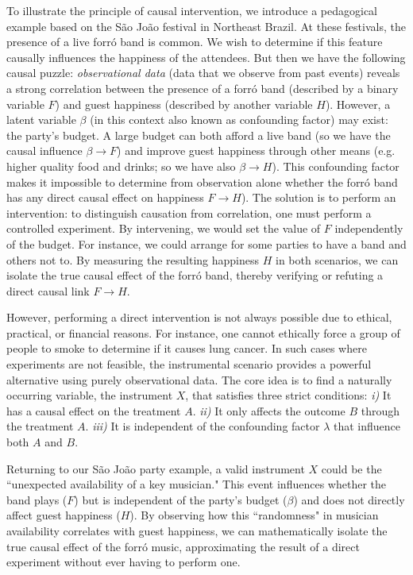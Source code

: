 \documentclass[aps,pra,reprint, superscriptaddress,showkeys]{revtex4-2}
\theoremstyle{plain}
\begin{document}
To illustrate the principle of causal intervention, we introduce a pedagogical example based on the São João festival in Northeast Brazil. At these festivals, the presence of a live forró band is common. We wish to determine if this feature causally influences the happiness of the attendees. But then we have the following causal puzzle: \textit{observational data} (data that we observe from past events) reveals a strong correlation between the presence of a forró band (described by a binary variable $F$) and guest happiness (described by another variable $H$). However, a latent variable $\beta$ (in this context also known as confounding factor) may exist: the party's budget. A large budget can both afford a live band (so we have the causal influence $\beta\longrightarrow F$) and improve guest happiness through other means (e.g. higher quality food and drinks; so we have also $\beta\longrightarrow H$). This confounding factor makes it impossible to determine from observation alone whether the forró band has any direct causal effect on happiness $F\longrightarrow H$). The solution is to perform an intervention: to distinguish causation from correlation, one must perform a controlled experiment. By intervening, we would set the value of $F$ independently of the budget. For instance, we could arrange for some parties to have a band and others not to. By measuring the resulting happiness $H$ in both scenarios, we can isolate the true causal effect of the forró band, thereby verifying or refuting a direct causal link $F\longrightarrow H$.
    

However, performing a direct intervention is not always possible due to ethical, practical, or financial reasons. For instance, one cannot ethically force a group of people to smoke to determine if it causes lung cancer. In such cases where experiments are not feasible, the instrumental scenario provides a powerful alternative using purely observational data. The core idea is to find a naturally occurring variable, the instrument $X$, that satisfies three strict conditions: \textit{i)}  It has a causal effect on the treatment $A$.  \textit{ii)} It only affects the outcome $B$ through the treatment $A$. \textit{iii)}   It is independent of the confounding factor $\lambda$ that influence both $A$ and $B$. 

Returning to our São João party example, a valid instrument $X$ could be the ``unexpected availability of a key musician." This event influences whether the band plays ($F$) but is independent of the party's budget ($\beta$) and does not directly affect guest happiness ($H$). By observing how this ``randomness" in musician availability correlates with guest happiness, we can mathematically isolate the true causal effect of the forró music, approximating the result of a direct experiment without ever having to perform one.  
\end{document}

